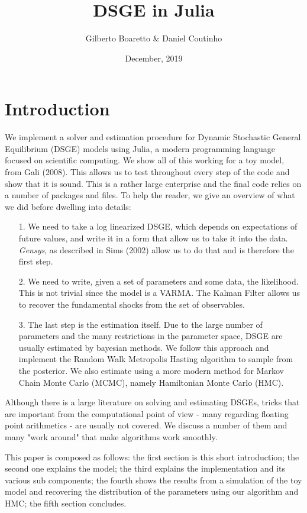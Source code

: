 \documentclass[12pt,a4paper]{article}
\title{ DSGE in Julia }
\author{ Gilberto Boaretto & Daniel Coutinho }
\date{ December, 2019 }
\begin{document}
\maketitle

\section{Introduction}
We implement a solver and estimation procedure for Dynamic Stochastic General Equilibrium (DSGE) models using Julia, a modern programming language focused on scientific computing. We show all of this working for a toy model, from Gali (2008). This allows us to test throughout every step of the code and show that it is sound. This is a rather large enterprise and the final code relies on a number of packages and files. To help the reader, we give an overview of what we did before dwelling into details:

\begin{itemize}
\item[1. ] We need to take a log linearized DSGE, which depends on expectations of future values, and write it in a form that allow us to take it into the data. \emph{Gensys}, as described in Sims (2002) allow us to do that and is therefore the first step.


\item[2. ] We need to write, given a set of parameters and some data, the likelihood. This is not trivial since the model is a VARMA. The Kalman Filter allows us to recover the fundamental shocks from the set of observables.


\item[3. ] The last step is the estimation itself. Due to the large number of parameters and the many restrictions in the parameter space, DSGE are usually estimated by bayesian methods. We follow this approach and implement the Random Walk Metropolis Hasting algorithm to sample from the posterior. We also estimate using a more modern method for Markov Chain Monte Carlo (MCMC), namely Hamiltonian Monte Carlo (HMC).

\end{itemize}
Although there is a large literature on solving and estimating DSGEs, tricks that are important from the computational point of view - many regarding floating point arithmetics - are usually not covered. We discuss a number of them and many "work around" that make algorithms work smoothly.

This paper is composed as follows: the first section is this short introduction; the second one explains the model; the third explains the implementation and its various sub components; the fourth shows the results from a simulation of the toy model and recovering the distribution of the parameters using our algorithm and HMC; the fifth section concludes.
\end{document}
